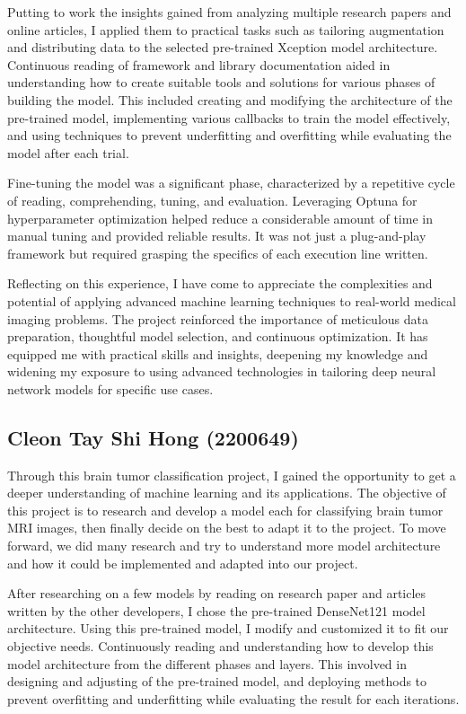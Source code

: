 Putting to work the insights gained from analyzing multiple research papers and online articles, I applied them to practical tasks such as tailoring augmentation and distributing data to the selected pre-trained Xception model architecture. Continuous reading of framework and library documentation aided in understanding how to create suitable tools and solutions for various phases of building the model. This included creating and modifying the architecture of the pre-trained model, implementing various callbacks to train the model effectively, and using techniques to prevent underfitting and overfitting while evaluating the model after each trial.

Fine-tuning the model was a significant phase, characterized by a repetitive cycle of reading, comprehending, tuning, and evaluation. Leveraging Optuna for hyperparameter optimization helped reduce a considerable amount of time in manual tuning and provided reliable results. It was not just a plug-and-play framework but required grasping the specifics of each execution line written.

Reflecting on this experience, I have come to appreciate the complexities and potential of applying advanced machine learning techniques to real-world medical imaging problems. The project reinforced the importance of meticulous data preparation, thoughtful model selection, and continuous optimization. It has equipped me with practical skills and insights, deepening my knowledge and widening my exposure to using advanced technologies in tailoring deep neural network models for specific use cases.

\subsection{Cleon Tay Shi Hong (2200649)}

Through this brain tumor classification project, I gained the opportunity to get a deeper understanding of machine learning and its applications. The objective of this project is to research and develop a model each for classifying brain tumor MRI images, then finally decide on the best to adapt it to the project. To move forward, we did many research and try to understand more model architecture and how it could be implemented and adapted into our project.

After researching on a few models by reading on research paper and articles written by the other developers, I chose the pre-trained DenseNet121 model architecture. Using this pre-trained model, I modify and customized it to fit our objective needs. Continuously reading and understanding how to develop this model architecture from the different phases and layers. This involved in designing and adjusting of the pre-trained model, and deploying methods to prevent overfitting and underfitting while evaluating the result for each iterations.

